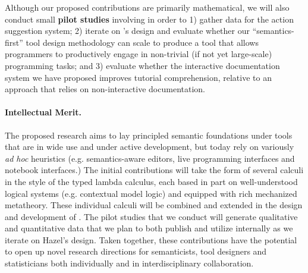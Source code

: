Although our proposed contributions are primarily {mathematical}, we will also conduct small \textbf{pilot studies} involving in order to 1) gather data for the action suggestion system; 2) iterate on \HazelEnv's design and evaluate whether our ``semantics-first'' tool design methodology can scale to produce a tool that allows programmers to productively engage in non-trivial (if not yet large-scale) programming tasks; and 3) evaluate whether the interactive documentation system we have proposed improves tutorial comprehension, relative to an approach that relies on non-interactive documentation.

\vspace{-2px}\paragraph{Intellectual Merit.}


The proposed research aims to lay principled semantic foundations under 
tools that are in wide use and under active development, but today rely on variously \emph{ad hoc} heuristics (e.g. semantics-aware
editors, live programming interfaces and notebook interfaces.) The initial contributions will 
take the form of several calculi in the style of the typed lambda calculus, each based in part on 
well-understood logical systems (e.g. contextual model logic) and equipped with 
rich mechanized metatheory. 
These individual calculi will be combined and extended in the design and development of \HazelEnv. The pilot studies that we conduct will generate qualitative and quantitative data that we plan to both publish and utilize internally as we iterate on Hazel's design. Taken together, these contributions have the potential to open up novel research directions for semanticists, tool designers and statisticians both individually and in interdisciplinary collaboration. 
%

